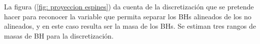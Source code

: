 La figura (\ref{fig: proyeccion espines}) da cuenta de la discretización que se pretende hacer para reconocer la variable que permita separar los BHs alineados de los no alineados, y en este caso resulta ser la masa de los BHs.
Se estiman tres rangos de masas de BH para la discretización. 



